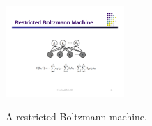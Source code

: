 \begin{figure}[!htp]
  \centering
  \includegraphics[width=0.4\textwidth]{Figure/rbm} \\
  \caption{A restricted Boltzmann machine.}\label{rbm}
\end{figure}
